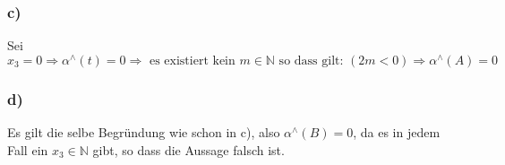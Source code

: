 \documentclass[11pt]{amsart}
\begin{document}
\subsubsection*{c)}
Sei \( x_3 = 0 \Rightarrow \alpha^{\wedge}(t) = 0 \Rightarrow\mbox{ es existiert kein } m \in \mathbb{N} 
\mbox{ so dass gilt: } (2m < 0) \Rightarrow \alpha^{\wedge}(A) = 0  \)

\subsubsection*{d)}
Es gilt die selbe Begründung wie schon in c), also $\alpha^{\wedge}(B) = 0$, da es in jedem Fall
ein $x_3 \in \mathbb{N}$ gibt, so dass die Aussage falsch ist.
\end{document}
